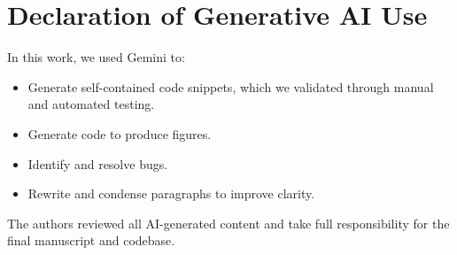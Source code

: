 


\section{Declaration of Generative AI Use}
In this work, we used Gemini to:
\begin{itemize}
    \item Generate self-contained code snippets, which we validated through manual and automated testing.
    \item Generate code to produce figures.
    \item Identify and resolve bugs.
    \item Rewrite and condense paragraphs to improve clarity.
\end{itemize}
The authors reviewed all AI-generated content and take full responsibility for the final manuscript and codebase.